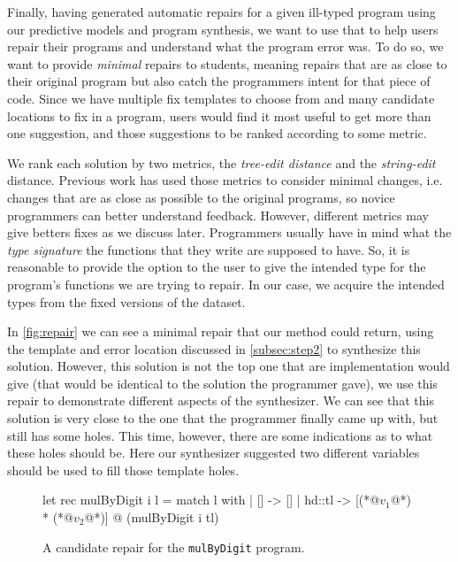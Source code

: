 Finally, having generated automatic repairs for a given ill-typed program using
our predictive models and program synthesis, we want to use that to help users
repair their programs and understand what the program error was. To do so, we
want to provide \emph{minimal} repairs to students, meaning repairs that are as
close to their original program but also catch the programmers intent for that
piece of code. Since we have multiple fix templates to choose from and many
candidate locations to fix in a program, users would find it most useful to get
more than one suggestion, and those suggestions to be ranked according to some
metric.

 We rank each solution by two metrics, the
\emph{tree-edit distance} and the \emph{string-edit} distance. Previous work has
used those metrics to consider minimal changes, i.e. changes that are as close
as possible to the original programs, so novice programmers can better
understand feedback. However, different metrics may give betters fixes as we
discuss later. Programmers usually have in mind what the \emph{type signature}
the functions that they write are supposed to have. So, it is reasonable to
provide the option to the user to give the intended type for the program's
functions we are trying to repair. In our case, we acquire the intended types
from the fixed versions of the dataset.

 In \autoref{fig:repair} we can see a minimal repair that our
method could return, using the template and error location discussed in
\autoref{subsec:step2} to synthesize this solution. However, this solution is
not the top one that are implementation would give (that would be identical to
the solution the programmer gave), we use this repair to demonstrate different
aspects of the synthesizer. We can see that this solution is very close to the
one that the programmer finally came up with, but still has some holes. This
time, however, there are some indications as to what these holes should be. Here
our synthesizer suggested two different variables should be used to fill those
template holes.

\begin{figure}[ht]
\begin{ecode}
let rec mulByDigit i l =
  match l with
  | []     -> []
  | hd::tl -> [(*@$v_1$@*) * (*@$v_2$@*)] @ (mulByDigit i tl)
\end{ecode}
\caption{A candidate repair for the \texttt{mulByDigit} program.}
\label{fig:repair}
\end{figure}
